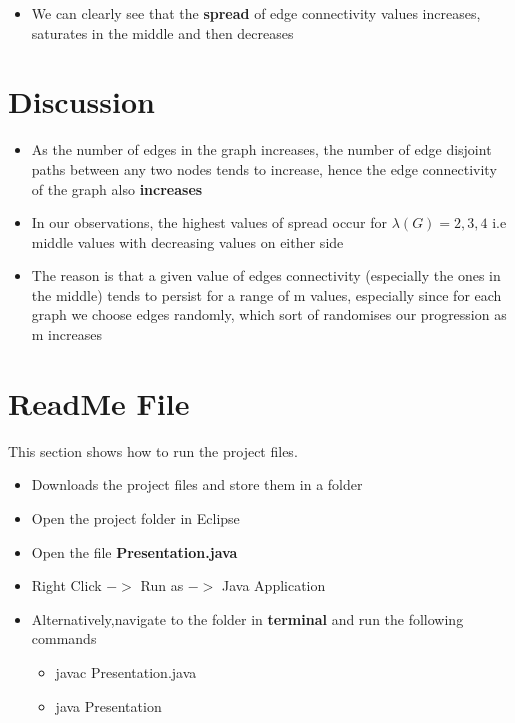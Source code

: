 \documentclass[12pt,letterpaper,titlepage,en-US]{article}
\begin{document}
\begin{itemize}
\item We can clearly see that the \textbf{spread} of edge connectivity values increases, saturates in the middle and then decreases
\end{itemize}
 
\section{Discussion}
\begin{itemize}

\item As the number of edges in the graph increases, the number of edge disjoint paths between any two nodes tends to increase, hence the edge connectivity of the graph also \textbf{increases}

\item In our observations, the highest values of spread occur for $\lambda(G)=2,3,4$ i.e middle values with decreasing values on either side

\item The reason is that a given value of  edges connectivity (especially the ones in the middle) tends to persist for a range of m values, especially since for each graph we choose edges randomly, which sort of randomises our progression as m increases



\end{itemize}





  \section{ReadMe File}
  This section shows how to run the project files.
  \begin{itemize}
  \item Downloads the project files and store them in a folder
  \item Open the project folder in Eclipse
  \item Open the file \textbf{Presentation.java}
  \item Right Click $->$ Run as $->$ Java Application
  \item Alternatively,navigate to the folder in \textbf{terminal} and run the following commands
  \begin{itemize}
  \item javac Presentation.java
  \item java Presentation
  \end{itemize}
  \end{itemize}
\end{document}
